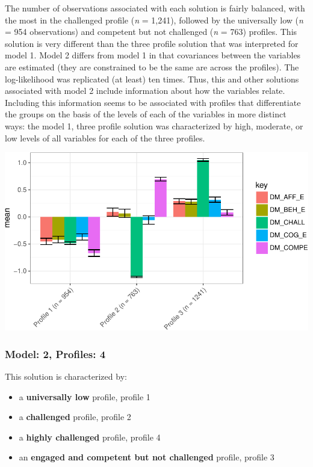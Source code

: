 \documentclass[]{msu-thesis}
\providecommand{\tightlist}{%
  \setlength{\itemsep}{0pt}\setlength{\parskip}{0pt}}
\theoremstyle{definition}
\theoremstyle{definition}
\theoremstyle{definition}
\theoremstyle{remark}
\begin{document}
The number of observations associated with each solution is fairly
balanced, with the most in the challenged profile (\emph{n} = 1,241),
followed by the universally low (\emph{n} = 954 observations) and
competent but not challenged (\emph{n} = 763) profiles. This solution is
very different than the three profile solution that was interpreted for
model 1. Model 2 differs from model 1 in that covariances between the
variables are estimated (they are constrained to be the same are across
the profiles). The log-likelihood was replicated (at least) ten times.
Thus, this and other solutions associated with model 2 include
information about how the variables relate. Including this information
seems to be associated with profiles that differentiate the groups on
the basis of the levels of each of the variables in more distinct ways:
the model 1, three profile solution was characterized by high, moderate,
or low levels of all variables for each of the three profiles.

\begin{center}\includegraphics[width=0.8\linewidth]{rosenberg-dissertation_files/figure-latex/m2_3p-1} \end{center}

\subsubsection{Model: 2, Profiles: 4}\label{model-2-profiles-4}

This solution is characterized by:

\begin{itemize}
\tightlist
\item
  a \textbf{universally low} profile, profile 1
\item
  a \textbf{challenged} profile, profile 2
\item
  a \textbf{highly challenged} profile, profile 4
\item
  an \textbf{engaged and competent but not challenged} profile, profile
  3
\end{itemize}
\end{document}
